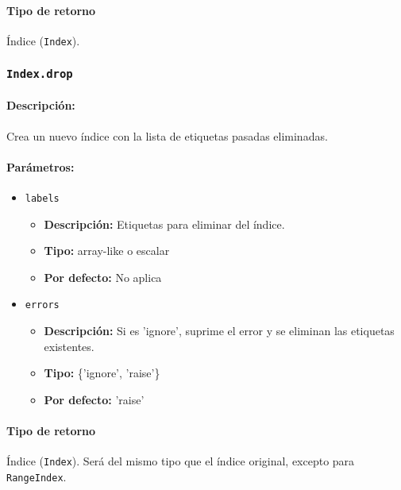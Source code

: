     \paragraph{Tipo de retorno}
    Índice (\texttt{Index}).

    \subsubsection{\texttt{Index.drop}}

    \paragraph{Descripción:}
    Crea un nuevo índice con la lista de etiquetas pasadas eliminadas.

    \paragraph{Parámetros:}

    \begin{itemize}
        \item \texttt{labels}
            \begin{itemize}
                \item \textbf{Descripción:} Etiquetas para eliminar del índice.
                \item \textbf{Tipo:} array-like o escalar
                \item \textbf{Por defecto:} No aplica
            \end{itemize}
        \item \texttt{errors}
            \begin{itemize}
                \item \textbf{Descripción:} Si es 'ignore', suprime el error y se eliminan las etiquetas existentes.
                \item \textbf{Tipo:} \{'ignore', 'raise'\}
                \item \textbf{Por defecto:} 'raise'
            \end{itemize}
    \end{itemize}

    \paragraph{Tipo de retorno}
    Índice (\texttt{Index}). Será del mismo tipo que el índice original, excepto para \texttt{RangeIndex}.

